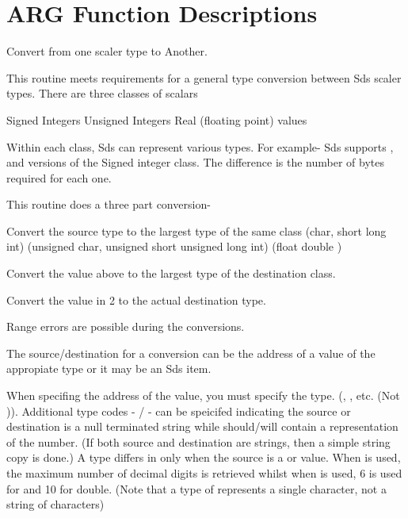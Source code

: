 \newpage
\section{ARG Function Descriptions}
\label{arg-functions}

\begin{manroutinedescription}
	Convert from one scaler {} type to Another.

	This routine meets requirements for a general type conversion
	between Sds scaler types.  There are three classes of scalars

\begin{manenumerate}
Signed Integers
Unsigned Integers
Real (floating point) values

\end{manenumerate}
	Within each class, Sds can represent various types.  For example-
	Sds supports {}, {} {%
} and {} versions of
	the Signed integer class.  The difference is the number of bytes
	required for
	each one.
	
	This routine does a three part conversion-
\begin{manenumerate}
Convert the source type to the largest type of the same %
class
		    (char, short {\mantt{->}} long int)
		    (unsigned char, unsigned short {\mantt{->}} unsigned long int)
		    (float {\mantt{->}} double )
	
 
Convert the value above to the largest type of the %
destination
		class.

Convert the value in 2 to the actual destination type.

\end{manenumerate}
        Range errors are possible during the conversions.


	The source/destination for a conversion can be the address of
	a value of the appropiate type or it may be an Sds item.

	When specifing the address of the value, you must specify the
	type. ({}, {}, {} etc. %
 (Not {})).
	Additional type codes - {}/{} - %
can be speicifed
	indicating the source or destination is a null terminated string while
	should/will contain a representation of the number.  (If both source
	and destination are strings, then a simple string copy is done.)
	A {} type differs in only when the source is a {} or
	{} value.  When {} is used, the maximum %
number of
	decimal digits is retrieved whilst when {} is used, 6 %
is used
	for {} and 10  for double.  (Note that a type of {}
	represents a single character, not a string of characters)
	

\end{manroutinedescription}

